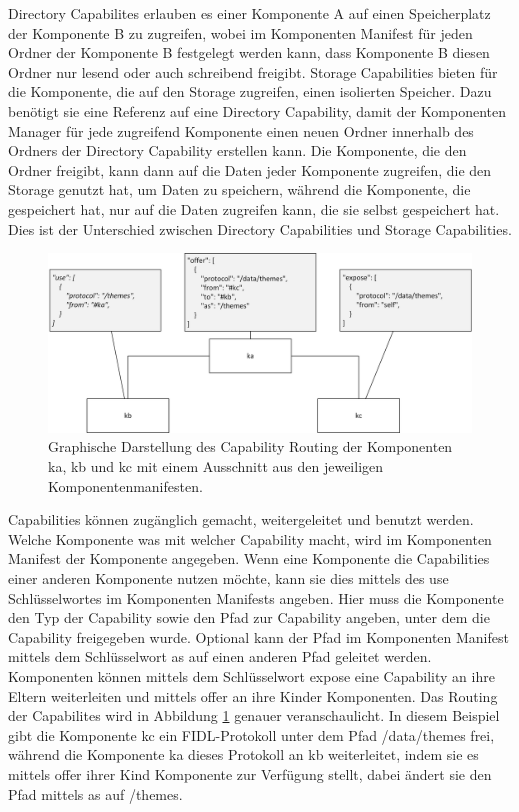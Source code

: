 \documentclass[a4paper]{scrartcl}
\begin{document}
Directory Capabilites erlauben es einer Komponente A auf einen Speicherplatz der Komponente B zu zugreifen, wobei im Komponenten Manifest für jeden Ordner der Komponente B festgelegt werden kann, dass Komponente B diesen Ordner nur lesend oder auch schreibend freigibt. Storage Capabilities bieten für die Komponente, die auf den Storage zugreifen, einen isolierten Speicher. Dazu benötigt sie eine Referenz auf eine Directory Capability, damit der Komponenten Manager für jede zugreifend Komponente einen neuen Ordner innerhalb des Ordners der Directory Capability erstellen kann. Die Komponente, die den Ordner freigibt, kann dann auf die Daten jeder Komponente zugreifen, die den Storage genutzt hat, um Daten zu speichern, während die Komponente, die gespeichert hat, nur auf die Daten zugreifen kann, die sie selbst gespeichert hat. Dies ist der Unterschied zwischen Directory Capabilities und Storage Capabilities.


\begin{figure}
	\centering
	\includegraphics[width=1\textwidth]{figure/Capability_Routing}
	\caption[Kurzform vom Bild]{Graphische Darstellung des Capability Routing der Komponenten ka, kb und kc mit einem Ausschnitt aus den jeweiligen Komponentenmanifesten.}
	\label{abb:capabilityRouting}
\end{figure}
Capabilities können zugänglich gemacht, weitergeleitet und benutzt werden. Welche Komponente was mit welcher Capability macht, wird im Komponenten Manifest der Komponente angegeben. Wenn eine Komponente die Capabilities einer anderen Komponente nutzen möchte, kann sie dies mittels des use Schlüsselwortes im Komponenten Manifests angeben. Hier muss die Komponente den Typ der Capability sowie den Pfad zur Capability angeben, unter dem die Capability freigegeben wurde. Optional kann der Pfad im Komponenten Manifest mittels dem Schlüsselwort as auf einen anderen Pfad geleitet werden. Komponenten können mittels dem Schlüsselwort expose eine Capability an ihre Eltern weiterleiten und mittels offer an ihre Kinder Komponenten. Das Routing der Capabilites wird in Abbildung \ref{abb:capabilityRouting} genauer veranschaulicht. In diesem Beispiel gibt die Komponente kc ein FIDL-Protokoll unter dem Pfad /data/themes frei, während die Komponente ka dieses Protokoll an kb weiterleitet, indem sie es mittels offer ihrer Kind Komponente zur Verfügung stellt, dabei ändert sie den Pfad mittels as auf /themes. 
\end{document}
